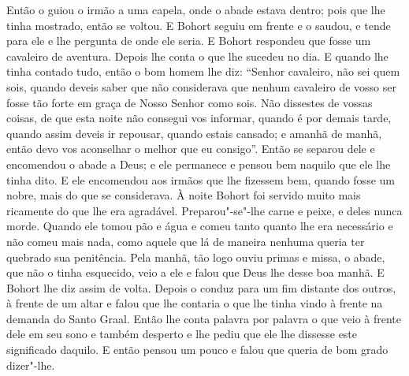 Então o guiou o irmão a uma capela, onde o abade estava dentro; pois que lhe
tinha mostrado, então se voltou. E Bohort seguiu em frente e o saudou, e tende
para ele e lhe pergunta de onde ele seria. E Bohort respondeu que fosse um
cavaleiro de aventura. Depois lhe conta o que lhe sucedeu no dia. E quando lhe
tinha contado tudo, então o bom homem lhe diz: “Senhor cavaleiro, não sei quem
sois, quando deveis saber que não considerava que nenhum cavaleiro de vosso ser
fosse tão forte em graça de Nosso Senhor como sois. Não dissestes de vossas
coisas, de que esta noite não consegui vos informar, quando é por demais tarde,
quando assim deveis ir repousar, quando estais cansado; e amanhã de manhã, 
então devo vos aconselhar o melhor que eu consigo”. Então se separou dele e
encomendou o abade a Deus; e ele permanece e pensou bem naquilo que ele lhe
tinha dito. E ele encomendou aos irmãos que lhe fizessem bem, quando fosse um
nobre, mais do que se considerava. À noite Bohort foi servido muito
mais ricamente do que lhe era agradável. Preparou"-se"-lhe carne e peixe, e deles
nunca morde. Quando ele tomou pão e água e comeu tanto quanto lhe era
necessário e não comeu mais nada, como aquele que lá de maneira nenhuma queria
ter quebrado sua penitência. Pela manhã, tão logo ouviu primas e missa, o
abade, que não o tinha esquecido, veio a ele e falou que Deus lhe desse boa
manhã. E Bohort lhe diz assim de volta. Depois o conduz para um fim distante
dos outros, à frente de um altar e falou que lhe contaria o que lhe tinha vindo
à frente na demanda do Santo Graal. Então lhe conta palavra por palavra o que
veio à frente dele em seu sono e também desperto e lhe pediu que ele lhe
dissesse este significado daquilo. E então pensou um pouco e falou que queria
de bom grado dizer"-lhe. 

